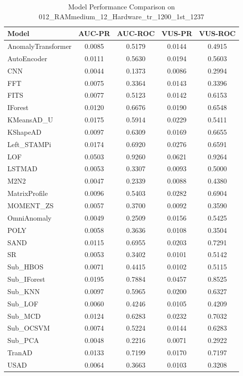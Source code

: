 \documentclass[12pt,oneside]{article}
\begin{document}
\begin{table}[htbp]
    \centering
    \caption{Model Performance Comparison on 012\_RAMmedium\_12\_Hardware\_tr\_1200\_1st\_1237}
    \begin{tabular}{|l|c|c|c|c|}
        \toprule
        \textbf{Model} & \textbf{AUC-PR} & \textbf{AUC-ROC} & \textbf{VUS-PR} & \textbf{VUS-ROC} \\
        \midrule
        AnomalyTransformer & 0.0085 & 0.5179 & 0.0144 & 0.4915 \\
        AutoEncoder & 0.0111 & 0.5630 & 0.0194 & 0.5603 \\
        CNN & 0.0044 & 0.1373 & 0.0086 & 0.2994 \\
        FFT & 0.0075 & 0.3364 & 0.0143 & 0.3396 \\
        FITS & 0.0077 & 0.5123 & 0.0142 & 0.6153 \\
        IForest & 0.0120 & 0.6676 & 0.0190 & 0.6548 \\
        KMeansAD\_U & 0.0175 & 0.5914 & 0.0229 & 0.5411 \\
        KShapeAD & 0.0097 & 0.6309 & 0.0169 & 0.6655 \\
        Left\_STAMPi & 0.0174 & 0.6920 & 0.0276 & 0.6591 \\
        LOF & 0.0503 & 0.9260 & 0.0621 & 0.9264 \\
        LSTMAD & 0.0053 & 0.3307 & 0.0093 & 0.5000 \\
        M2N2 & 0.0047 & 0.2339 & 0.0088 & 0.4380 \\
        MatrixProfile & 0.0096 & 0.5403 & 0.0282 & 0.6904 \\
        MOMENT\_ZS & 0.0057 & 0.3700 & 0.0092 & 0.3590 \\
        OmniAnomaly & 0.0049 & 0.2509 & 0.0156 & 0.5425 \\
        POLY & 0.0058 & 0.3636 & 0.0108 & 0.3504 \\
        SAND & 0.0115 & 0.6955 & 0.0203 & 0.7291 \\
        SR & 0.0053 & 0.3402 & 0.0101 & 0.5142 \\
        Sub\_HBOS & 0.0071 & 0.4415 & 0.0102 & 0.5115 \\
        Sub\_IForest & 0.0195 & 0.7884 & 0.0457 & 0.8525 \\
        Sub\_KNN & 0.0097 & 0.5965 & 0.0200 & 0.6327 \\
        Sub\_LOF & 0.0060 & 0.4246 & 0.0105 & 0.4209 \\
        Sub\_MCD & 0.0124 & 0.6283 & 0.0232 & 0.7032 \\
        Sub\_OCSVM & 0.0074 & 0.5224 & 0.0144 & 0.6283 \\
        Sub\_PCA & 0.0048 & 0.2216 & 0.0071 & 0.2922 \\
        TranAD & 0.0133 & 0.7199 & 0.0170 & 0.7197 \\
        USAD & 0.0064 & 0.3663 & 0.0103 & 0.3208 \\
        \bottomrule
    \end{tabular}
    
    \label{tab:model_performance_RAMmedium}
\end{table}
\end{document}
